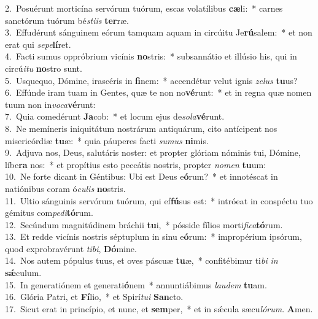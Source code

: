 {2.~}Posuérunt morticína servórum tuórum, escas volatílibus \textbf{cæ}li:~* carnes sanctórum tuórum bé\textit{sti}\textit{is} \textbf{ter}ræ.\\
{3.~}Effudérunt sánguinem eórum tamquam aquam in circúitu Je\textbf{rú}salem:~* et non erat qui \textit{se}\textit{pe}\textbf{lí}ret.\\
{4.~}Facti sumus oppróbrium vicínis \textbf{no}stris:~* subsannátio et illúsio his, qui in circú\textit{i}\textit{tu} \textbf{no}stro sunt.\\
{5.~}Usquequo, Dómine, irascéris in \textbf{fi}nem:~* accendétur velut ignis \textit{ze}\textit{lus} \textbf{tu}us?\\
{6.~}Effúnde iram tuam in Gentes, quæ te non no\textbf{vé}runt:~* et in regna quæ nomen tuum non in\textit{vo}\textit{ca}\textbf{vé}runt:\\
{7.~}Quia comedérunt \textbf{Ja}cob:~* et locum ejus de\textit{so}\textit{la}\textbf{vé}runt.\\
{8.~}Ne memíneris iniquitátum nostrárum antiquárum, cito antícipent nos misericórdiæ \textbf{tu}æ:~* quia páuperes facti \textit{su}\textit{mus} \textbf{ni}mis.\\
{9.~}Adjuva nos, Deus, salutáris noster: et propter glóriam nóminis tui, Dómine, líbe\textbf{ra} nos:~* et propítius esto peccátis nostris, propter \textit{no}\textit{men} \textbf{tu}um:\\
{10.~}Ne forte dicant in Géntibus: Ubi est Deus e\textbf{ó}rum?~* et innotéscat in natiónibus coram ó\textit{cu}\textit{lis} \textbf{no}stris.\\
{11.~}Ultio sánguinis servórum tuórum, qui ef\textbf{fú}sus est:~* intróeat in conspéctu tuo gémitus com\textit{pe}\textit{di}\textbf{tó}rum.\\
{12.~}Secúndum magnitúdinem bráchii \textbf{tu}i,~* pósside fílios morti\textit{fi}\textit{ca}\textbf{tó}rum.\\
{13.~}Et redde vicínis nostris séptuplum in sinu e\textbf{ó}rum:~* impropérium ipsórum, quod exprobravérunt \textit{ti}\textit{bi}, \textbf{Dó}mine.\\
{14.~}Nos autem pópulus tuus, et oves páscuæ \textbf{tu}æ,~* confitébimur ti\textit{bi} \textit{in} \textbf{sǽ}culum.\\
{15.~}In generatiónem et generati\textbf{ó}nem~* annuntiábimus \textit{lau}\textit{dem} \textbf{tu}am.\\
{16.~}Glória Patri, et \textbf{Fí}lio,~* et Spirí\textit{tu}\textit{i} \textbf{San}cto.\\
{17.~}Sicut erat in princípio, et nunc, et \textbf{sem}per,~* et in sǽcula sæcu\textit{ló}\textit{rum}. \textbf{A}men.\\
